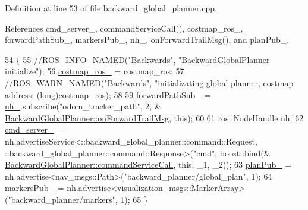 Definition at line 53 of file backward\+\_\+global\+\_\+planner.\+cpp.



References cmd\+\_\+server\+\_\+, command\+Service\+Call(), costmap\+\_\+ros\+\_\+, forward\+Path\+Sub\+\_\+, markers\+Pub\+\_\+, nh\+\_\+, on\+Forward\+Trail\+Msg(), and plan\+Pub\+\_\+.


\begin{DoxyCode}
54 \{
55     \textcolor{comment}{//ROS\_INFO\_NAMED("Backwards", "BackwardGlobalPlanner initialize");}
56     \hyperlink{classmove__base__z__client_1_1backward__global__planner_1_1BackwardGlobalPlanner_ae8c01babf5da5df079840246c34ef1ea}{costmap\_ros\_} = costmap\_ros;
57     \textcolor{comment}{//ROS\_WARN\_NAMED("Backwards", "initializating global planner, costmap address: %
       (long)costmap\_ros);}
58 
59     \hyperlink{classmove__base__z__client_1_1backward__global__planner_1_1BackwardGlobalPlanner_aa30061ee4e43cac7513fb253ccedd077}{forwardPathSub\_} = \hyperlink{classmove__base__z__client_1_1backward__global__planner_1_1BackwardGlobalPlanner_acc560c431ab390c2c32ba27fdbec95e6}{nh\_}.subscribe(\textcolor{stringliteral}{"odom\_tracker\_path"}, 2, &
      \hyperlink{classmove__base__z__client_1_1backward__global__planner_1_1BackwardGlobalPlanner_a21ba5e6dbe063eb3ea1a34d8cccf90a3}{BackwardGlobalPlanner::onForwardTrailMsg}, \textcolor{keyword}{this});
60 
61     ros::NodeHandle nh;
62     \hyperlink{classmove__base__z__client_1_1backward__global__planner_1_1BackwardGlobalPlanner_a470ef57fa2c4caf288ef4ba2934f44e2}{cmd\_server\_} = nh.advertiseService<::backward\_global\_planner::command::Request, 
      ::backward\_global\_planner::command::Response>(\textcolor{stringliteral}{"cmd"}, boost::bind(&
      \hyperlink{classmove__base__z__client_1_1backward__global__planner_1_1BackwardGlobalPlanner_ad6f5fb1f85f6869b06bd4cb0feada148}{BackwardGlobalPlanner::commandServiceCall}, \textcolor{keyword}{this}, \_1, \_2));
63     \hyperlink{classmove__base__z__client_1_1backward__global__planner_1_1BackwardGlobalPlanner_ab074d9ac8ea790d7f5275ee27dae940c}{planPub\_} = nh.advertise<nav\_msgs::Path>(\textcolor{stringliteral}{"backward\_planner/global\_plan"}, 1);
64     \hyperlink{classmove__base__z__client_1_1backward__global__planner_1_1BackwardGlobalPlanner_a52a247da9267a83e51679d41e09f11a4}{markersPub\_} = nh.advertise<visualization\_msgs::MarkerArray>(\textcolor{stringliteral}{"backward\_planner/markers"}, 1);
65 \}
\end{DoxyCode}


